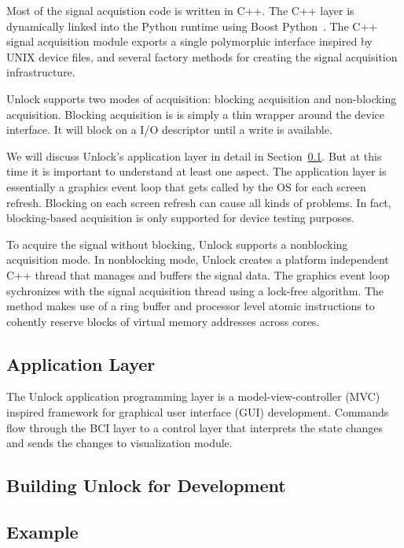 \documentclass[11pt]{article}
\begin{document}
Most of the signal acquistion code is written in C++.  The C++ layer is dynamically linked into the Python runtime using Boost Python~\cite{boostpython}.  The C++ signal acquisition module exports a single polymorphic interface inspired by UNIX device files, and several factory methods for creating the signal acquisition infrastructure.

Unlock supports two modes of acquisition: blocking acquisition and non-blocking acquisition.  Blocking acquisition is is simply a thin wrapper around the device interface.  It will block on a I/O descriptor until a write is available.

We will discuss Unlock's application layer in detail in Section~\ref{applicationsec}.  But at this time it is important to understand at least one aspect.  The application layer is essentially a graphics event loop that gets called by the OS for each screen refresh.  Blocking on each screen refresh can cause all kinds of problems.  In fact, blocking-based acquisition is only supported for device testing purposes. 

To acquire the signal without blocking, Unlock supports a nonblocking acquisition mode.  In nonblocking mode, Unlock creates a platform independent C++ thread that manages and buffers the signal data.  The graphics event loop sychronizes with the signal acquisition thread using a lock-free algorithm.  The method makes use of a ring buffer and processor level atomic instructions to cohently reserve blocks of virtual memory addresses across cores.
\subsection{Application Layer}\label{applicationsec}

The Unlock application programming layer is a model-view-controller (MVC)~\cite{mvc, mvc2} inspired framework for graphical user interface (GUI) development.  Commands flow through the BCI layer to a control layer that interprets the state changes and sends the changes to visualization module.

\subsection{Building Unlock for Development}
\subsection{Example}
\end{document}
